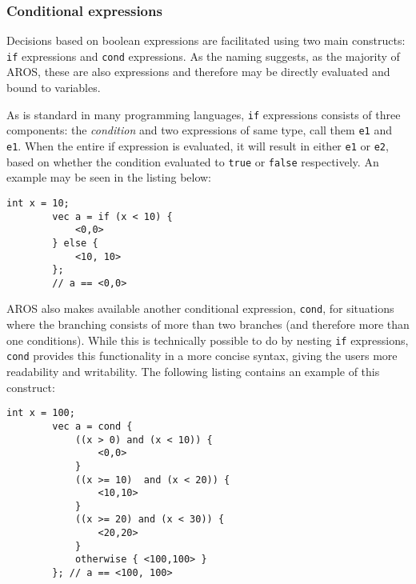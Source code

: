 \subsubsection{Conditional expressions}
Decisions based on boolean expressions are facilitated using two main constructs: \lstinline{if} expressions and \lstinline{cond} expressions. As the naming suggests, as the majority of AROS, these are also expressions and therefore may be directly evaluated and bound to variables.

\par As is standard in many programming languages, \lstinline{if} expressions consists of three components: the \textit{condition} and two expressions of same type, call them \lstinline{e1} and \lstinline{e1}. When the entire if expression is evaluated, it will result in either \lstinline{e1} or \lstinline{e2}, based on whether the condition evaluated to \lstinline{true} or \lstinline{false} respectively. An example may be seen in the listing below: 
    \begin{lstlisting}[language=aros, caption= Example of an if expression]
        int x = 10;
        vec a = if (x < 10) { 
            <0,0>    
        } else {
            <10, 10>
        };
        // a == <0,0>
    \end{lstlisting}

\par AROS also makes available another conditional expression, \lstinline{cond}, for situations where the branching consists of more than two branches (and therefore more than one conditions). While this is technically possible to do by nesting \lstinline{if} expressions, \lstinline{cond} provides this functionality in a more concise syntax, giving the users more readability and writability. The following listing contains an example of this construct:

    \begin{lstlisting}[language=aros, caption= Example of a cond expression]
        int x = 100;
        vec a = cond {
            ((x > 0) and (x < 10)) {
                <0,0>
            }
            ((x >= 10)  and (x < 20)) {
                <10,10>
            }
            ((x >= 20) and (x < 30)) {
                <20,20>
            }
            otherwise { <100,100> }
        }; // a == <100, 100>
    \end{lstlisting}
    
